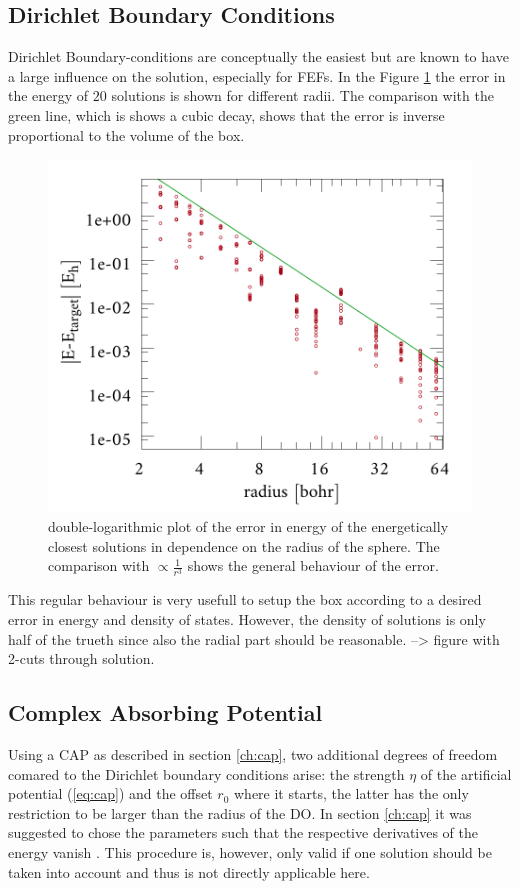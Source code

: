 \subsection{Dirichlet Boundary Conditions}
Dirichlet Boundary-conditions are conceptually the easiest but are known to have a large influence on the solution, especially for FEFs.
In the Figure \ref{fig:dbcRad} the error in the energy of $20$ solutions is shown for different radii.
The comparison with the green line, which is shows a cubic decay, shows that the error is inverse proportional to the volume of the box.
\begin{figure}
\includegraphics[width=\textwidth]{Figures/BC/DBCenergies}
\caption{double-logarithmic plot of the error in energy of the energetically closest solutions in dependence on the radius
of the sphere. The comparison with $\propto \frac{1}{r^3}$ shows the general behaviour of the error.}
\label{fig:dbcRad}
\end{figure}
This regular behaviour is very usefull to setup the box according to a desired error in energy and density of states.
However, the density of solutions is only half of the trueth since also the radial part should be reasonable.
--> figure with 2-cuts through solution.

\subsection{Complex Absorbing Potential}
Using a CAP as described in section \ref{ch:cap}, two additional degrees of freedom comared to the Dirichlet boundary conditions arise: the strength $\eta$ of the artificial potential (\ref{eq:cap}) and the offset $r_0$ where it starts, the latter has the only restriction to be larger than the radius of the DO.
In section \ref{ch:cap} it was suggested to chose the parameters such that the respective derivatives of the energy vanish \cite{CAPccEOM,CAPfreshlook}.
This procedure is, however, only valid if one solution should be taken into account and thus is not directly applicable here.

